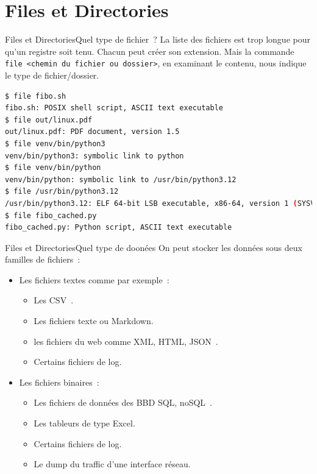 \documentclass{beamer}
\begin{document}
    \section{Files et Directories}\label{sec:files-directories}

    \begin{frame}[fragile]{Files et Directories}{Quel type de fichier~?}
        La liste des fichiers est trop longue pour qu'un registre soit tenu.
        Chacun peut créer son extension.
        Mais la commande \lstinline{file <chemin du fichier ou dossier>}, en examinant le contenu, nous indique le type de fichier/dossier.
        \begin{lstlisting}[language=bash]
$ file fibo.sh
fibo.sh: POSIX shell script, ASCII text executable
$ file out/linux.pdf
out/linux.pdf: PDF document, version 1.5
$ file venv/bin/python3
venv/bin/python3: symbolic link to python
$ file venv/bin/python
venv/bin/python: symbolic link to /usr/bin/python3.12
$ file /usr/bin/python3.12
/usr/bin/python3.12: ELF 64-bit LSB executable, x86-64, version 1 (SYSV), dynamically linked, interpreter /lib64/ld-linux-x86-64.so.2, BuildID[sha1]=ccd329aaf9256b96135a9e3f97cbf4c3829377e1, for GNU/Linux 3.2.0, stripped
$ file fibo_cached.py
fibo_cached.py: Python script, ASCII text executable
        \end{lstlisting}
    \end{frame}

    \begin{frame}[fragile]{Files et Directories}{Quel type de doonées}
        On peut stocker les données sous deux familles de fichiers~:
        \begin{itemize}
            \item Les fichiers textes comme par exemple~:
            \begin{itemize}
                \item Les CSV~.
                \item Les fichiers texte ou Markdown.
                \item les fichiers du web comme XML, HTML, JSON~.
                \item Certains fichiers de log.
            \end{itemize}
            \item Les fichiers binaires~:
            \begin{itemize}
                \item Les fichiers de données des BBD SQL, noSQL~.
                \item Les tableurs de type Excel.
                \item Certains fichiers de log.
                \item Le dump du traffic d'une interface réseau.
            \end{itemize}
        \end{itemize}
    \end{frame}
\end{document}
